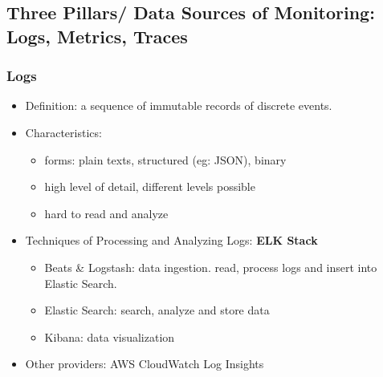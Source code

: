 %	



\subsection{Three Pillars/ Data Sources of Monitoring: Logs, Metrics, Traces}

\subsubsection{Logs}
\begin{itemize}
	\item Definition: a sequence of immutable records of discrete events.
	\item Characteristics:
	\begin{itemize}
		\item forms: plain texts, structured (eg: JSON), binary
		\item high level of detail, different levels possible
		\item hard to read and analyze
	\end{itemize}
	\item Techniques of Processing and Analyzing Logs: \textbf{ELK Stack}
	\begin{itemize}
		\item Beats \& Logstash: data ingestion. read, process logs and insert into Elastic Search.
		\item Elastic Search: search, analyze and store data
		\item Kibana: data visualization
	\end{itemize}
	\item Other providers: AWS CloudWatch Log Insights
	
\end{itemize}

